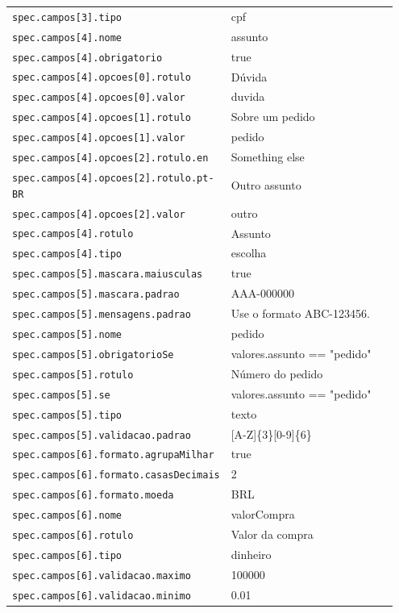 \begin{tabular}{@{}p{0.35\linewidth}p{0.6\linewidth}@{}}
\texttt{spec.campos[3].tipo} & cpf \\
\texttt{spec.campos[4].nome} & assunto \\
\texttt{spec.campos[4].obrigatorio} & true \\
\texttt{spec.campos[4].opcoes[0].rotulo} & Dúvida \\
\texttt{spec.campos[4].opcoes[0].valor} & duvida \\
\texttt{spec.campos[4].opcoes[1].rotulo} & Sobre um pedido \\
\texttt{spec.campos[4].opcoes[1].valor} & pedido \\
\texttt{spec.campos[4].opcoes[2].rotulo.en} & Something else \\
\texttt{spec.campos[4].opcoes[2].rotulo.pt-BR} & Outro assunto \\
\texttt{spec.campos[4].opcoes[2].valor} & outro \\
\texttt{spec.campos[4].rotulo} & Assunto \\
\texttt{spec.campos[4].tipo} & escolha \\
\texttt{spec.campos[5].mascara.maiusculas} & true \\
\texttt{spec.campos[5].mascara.padrao} & AAA-000000 \\
\texttt{spec.campos[5].mensagens.padrao} & Use o formato ABC-123456. \\
\texttt{spec.campos[5].nome} & pedido \\
\texttt{spec.campos[5].obrigatorioSe} & valores.assunto == "pedido" \\
\texttt{spec.campos[5].rotulo} & Número do pedido \\
\texttt{spec.campos[5].se} & valores.assunto == "pedido" \\
\texttt{spec.campos[5].tipo} & texto \\
\texttt{spec.campos[5].validacao.padrao} & [A-Z]\{3\}[0-9]\{6\} \\
\texttt{spec.campos[6].formato.agrupaMilhar} & true \\
\texttt{spec.campos[6].formato.casasDecimais} & 2 \\
\texttt{spec.campos[6].formato.moeda} & BRL \\
\texttt{spec.campos[6].nome} & valorCompra \\
\texttt{spec.campos[6].rotulo} & Valor da compra \\
\texttt{spec.campos[6].tipo} & dinheiro \\
\texttt{spec.campos[6].validacao.maximo} & 100000 \\
\texttt{spec.campos[6].validacao.minimo} & 0.01 \\

\end{tabular}
